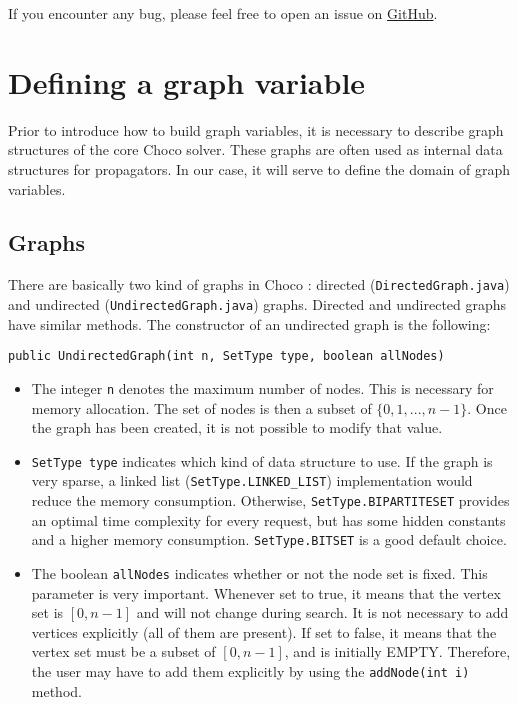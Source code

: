\documentclass{article}
\begin{document}
If you encounter any bug, please feel free to open an issue on \href{https://github.com/chocoteam/choco-graph/}{GitHub}.

\newpage{}
\section{Defining a graph variable}

Prior to introduce how to build graph variables, it is necessary to describe graph structures of the core Choco solver. These graphs are often used as internal data structures for propagators. In our case, it will serve to define the domain of graph variables. 

\subsection{Graphs}

There are basically two kind of graphs in Choco : directed (\texttt{DirectedGraph.java}) and undirected (\texttt{UndirectedGraph.java}) graphs. 
Directed and undirected graphs have similar methods. The constructor of an undirected graph is the following: 
\begin{lstlisting}
public UndirectedGraph(int n, SetType type, boolean allNodes)
\end{lstlisting}

\begin{itemize}
\item The integer \texttt{n} denotes the maximum number of nodes. This is necessary for memory allocation. The set of nodes is then a subset of $\{0,1,...,n-1\}$. Once the graph has been created, it is not possible to modify that value. 
\item \texttt{SetType type} indicates which kind of data structure to use. If the graph is very sparse, a linked list (\texttt{SetType.LINKED\_LIST}) implementation would reduce the memory consumption. Otherwise, \texttt{SetType.BIPARTITESET} provides an optimal time complexity for every request, but has some hidden constants and a higher memory consumption. \texttt{SetType.BITSET} is a good default choice. 
\item The boolean \texttt{allNodes} indicates whether or not the node set is fixed. This parameter is very important. Whenever set to true, it means that the vertex set is $[0,n-1]$ and will not change during search. It is not necessary to add vertices explicitly (all of them are present). If set to false, it means that the vertex set must be a subset of $[0,n-1]$, and is initially EMPTY. Therefore, the user may have to add them explicitly by using the \texttt{addNode(int i)} method.
\end{itemize}
\end{document}
